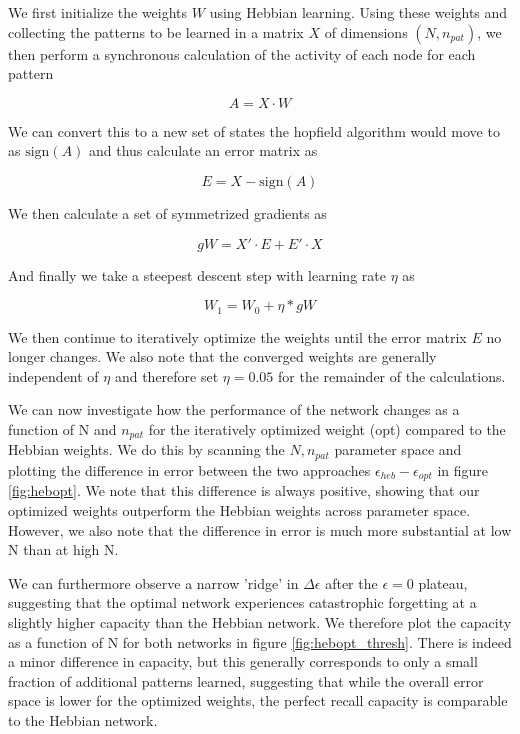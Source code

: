 \documentclass{article}
\begin{document}
We first initialize the weights $W$ using Hebbian learning. Using these weights and collecting the patterns to be learned in a matrix $X$ of dimensions $(N, n_{pat})$, we then perform a synchronous calculation of the activity of each node for each pattern

\begin{equation}
A = X \cdot W
\end{equation}

We can convert this to a new set of states the hopfield algorithm would move to as $\text{sign}(A)$ and thus calculate an error matrix as

\begin{equation}
E = X - \text{sign}(A)
\end{equation}

We then calculate a set of symmetrized gradients as

\begin{equation}
gW = X' \cdot E + E' \cdot X
\end{equation}

And finally we take a steepest descent step with learning rate $\eta$ as

\begin{equation}
W_1 = W_0 + \eta*gW 
\end{equation}

We then continue to iteratively optimize the weights until the error matrix $E$ no longer changes. We also note that the converged weights are generally independent of $\eta$ and therefore set $\eta=0.05$ for the remainder of the calculations.

We can now investigate how the performance of the network changes as a function of N and $n_{pat}$ for the iteratively optimized weight (opt) compared to the Hebbian weights. We do this by scanning the $N, n_{pat}$ parameter space and plotting the difference in error between the two approaches $\epsilon_{heb}-\epsilon_{opt}$ in figure \ref{fig:hebopt}. We note that this difference is always positive, showing that our optimized weights outperform the Hebbian weights across parameter space. However, we also note that the difference in error is much more substantial at low N than at high N.

We can furthermore observe a narrow 'ridge' in $\Delta \epsilon$ after the $\epsilon=0$ plateau, suggesting that the optimal network experiences catastrophic forgetting at a slightly higher capacity than the Hebbian network. We therefore plot the capacity as a function of N for both networks in figure \ref{fig:hebopt_thresh}. There is indeed a minor difference in capacity, but this generally corresponds to only a small fraction of additional patterns learned, suggesting that while the overall error space is lower for the optimized weights, the perfect recall capacity is comparable to the Hebbian network.
\end{document}
